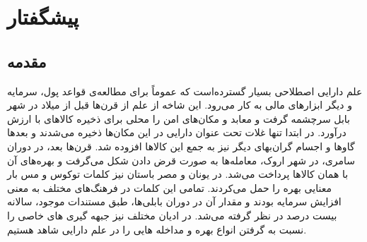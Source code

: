 \documentclass[a4paper,titlepage,12pt,fleqn,oneside]{report}
\begin{document}
\chapter{پیشگفتار}

\section{مقدمه}
علم دارایی اصطلاحی بسیار گسترده‌است که عموماً برای مطالعه‌ی قواعد پول، سرمایه و دیگر ابزارهای مالی به کار می‌رود. این شاخه از علم از قرن‌ها قبل از میلاد در شهر بابل سرچشمه گرفت و معابد و مکان‌های امن را محلی برای ذخیره کالاهای با ارزش درآورد. در ابتدا تنها غلات تحت عنوان دارایی در این مکان‌ها ذخیره می‌شدند و بعدها گاوها و اجسام گران‌بهای دیگر نیز به جمع این کالاها افزوده شد. قرن‌ها بعد،
در دوران سامری، در شهر اروک، معامله‌ها به صورت قرض دادن شکل می‌گرفت و بهره‌های آن با همان کالاها پرداخت می‌شد. در یونان و مصر باستان نیز کلمات توکوس و مس بار معنایی بهره را حمل می‌کردند. تمامی این کلمات در فرهنگ‌های مختلف به معنی افزایش سرمایه بودند و مقدار آن در دوران بابلی‌ها، طبق مستندات موجود، سالانه بیست درصد در نظر گرفته می‌شد.
در ادیان مختلف نیز جبهه گیری های خاصی را نسبت به گرفتن انواع بهره و مداخله هایی را در علم دارایی شاهد هستیم.  
\end{document}
